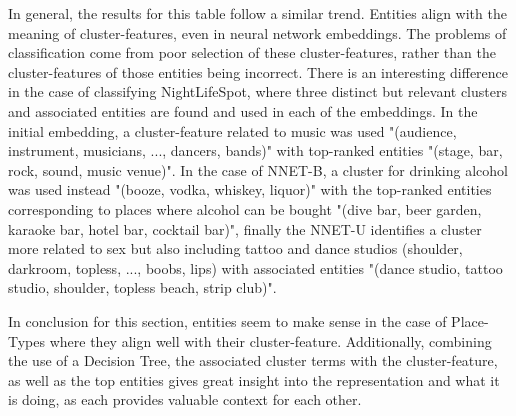 In general, the results for this table follow a similar trend. Entities align with the meaning of cluster-features, even in neural network embeddings. The problems of classification come from poor selection of these cluster-features, rather than the cluster-features of those entities being incorrect. There is an interesting difference in the case of classifying NightLifeSpot, where three distinct but relevant clusters and associated entities are found and used in each of the embeddings. In the initial embedding, a cluster-feature related to music was used "(audience, instrument, musicians, ..., dancers, bands)" with top-ranked entities  "(stage, bar, rock, sound, music venue)". In the case of NNET-B, a cluster for drinking alcohol was used instead "(booze, vodka, whiskey, liquor)" with the top-ranked entities corresponding to places where  alcohol can be bought "(dive bar, beer garden, karaoke bar, hotel bar, cocktail bar)", finally the NNET-U identifies a cluster more related to sex but also including tattoo and dance studios (shoulder, darkroom, topless, ..., boobs, lips) with associated entities  "(dance studio, tattoo studio, shoulder, topless beach, strip club)". 

In conclusion for this section, entities seem to make sense in the case of Place-Types where they align well with their cluster-feature. Additionally, combining the use of a Decision Tree, the associated cluster terms with the cluster-feature, as well as the top entities gives great insight into the representation and what it is doing, as each provides valuable context for each other. 

